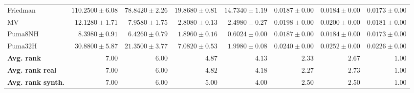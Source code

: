 \begin{table*}[!htbp]
{\begin{tabular}{lrrrrrrr}
		Friedman & $110.2500 \pm 6.08$ & $78.8420 \pm 2.26$ & $19.8680 \pm 0.81$ & $14.7340 \pm 1.19$ & $0.0187 \pm 0.00$ & $0.0184 \pm 0.00$ & $\mathbf{0.0173 \pm 0.00}$\\
		MV & $12.1280 \pm 1.71$ & $7.9580 \pm 1.75$ & $2.8080 \pm 0.13$ & $2.4980 \pm 0.27$ & $0.0198 \pm 0.00$ & $0.0200 \pm 0.00$ & $\mathbf{0.0181 \pm 0.00}$\\
		Puma8NH & $8.3980 \pm 0.91$ & $6.4260 \pm 0.79$ & $1.8960 \pm 0.16$ & $0.6024 \pm 0.00$ & $0.0187 \pm 0.00$ & $0.0184 \pm 0.00$ & $\mathbf{0.0173 \pm 0.00}$\\
		Puma32H & $30.8800 \pm 5.87$ & $21.3500 \pm 3.77$ & $7.0820 \pm 0.53$ & $1.9980 \pm 0.08$ & $0.0240 \pm 0.00$ & $0.0252 \pm 0.00$ & $\mathbf{0.0226 \pm 0.00}$\\
		\midrule
		\textbf{{Avg. rank}} & $7.00$ & $6.00$ & $4.87$ & $4.13$ & $2.33$ & $2.67$ & $\mathbf{1.00}$\\
		\textbf{{Avg. rank real}} & $7.00$ & $6.00$ & $4.82$ & $4.18$ & $2.27$ & $2.73$ & $\mathbf{1.00}$\\
		\textbf{{Avg. rank synth.}} & $7.00$ & $6.00$ & $5.00$ & $4.00$ & $2.50$ & $2.50$ & $\mathbf{1.00}$\\
		\bottomrule
	\end{tabular}}
\end{table*}

